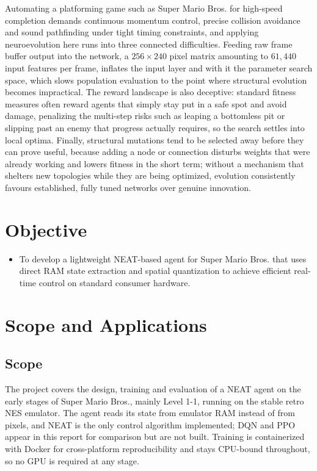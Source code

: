 Automating a platforming game such as Super Mario Bros. for high-speed
completion demands continuous momentum control, precise collision avoidance and
sound pathfinding under tight timing constraints, and applying neuroevolution
here runs into three connected difficulties. Feeding raw frame buffer output
into the network, a $256 \times 240$ pixel matrix amounting to $61{,}440$ input
features per frame, inflates the input layer and with it the parameter search
space, which slows population evaluation to the point where structural
evolution becomes impractical. The reward landscape is also deceptive: standard
fitness measures often reward agents that simply stay put in a safe spot and
avoid damage, penalizing the multi-step risks such as leaping a bottomless pit
or slipping past an enemy that progress actually requires, so the search settles
into local optima. Finally, structural mutations tend to be selected away before
they can prove useful, because adding a node or connection disturbs weights that
were already working and lowers fitness in the short term; without a mechanism
that shelters new topologies while they are being optimized, evolution
consistently favours established, fully tuned networks over genuine innovation.

\section{Objective}
\label{sec:objective}

\begin{itemize}
    \item To develop a lightweight NEAT-based agent for Super Mario Bros. that
    uses direct RAM state extraction and spatial quantization to achieve
    efficient real-time control on standard consumer hardware.
\end{itemize}

\section{Scope and Applications}
\label{sec:scope-applications}

\subsection{Scope}
\label{subsec:scope}

The project covers the design, training and evaluation of a NEAT agent on the
early stages of Super Mario Bros., mainly Level 1-1, running on the stable
retro NES emulator. The agent reads its state from emulator RAM instead of from
pixels, and NEAT is the only control algorithm implemented; DQN and PPO appear
in this report for comparison but are not built. Training is containerized with
Docker for cross-platform reproducibility and stays CPU-bound throughout, so no
GPU is required at any stage.

